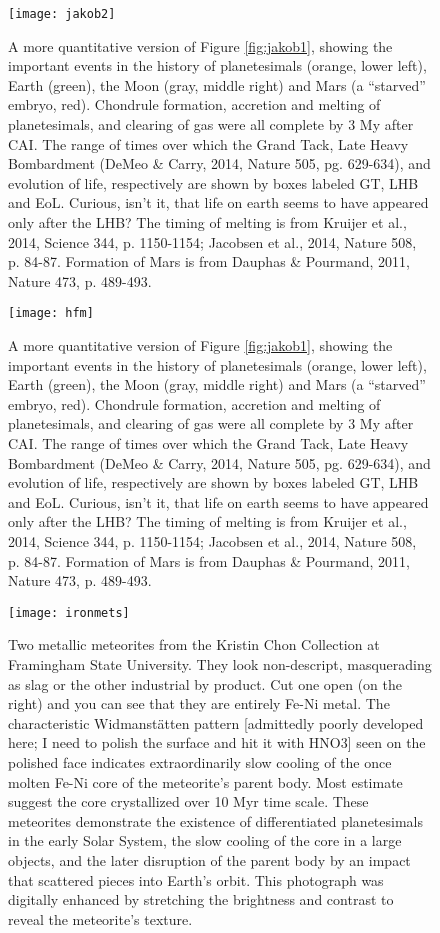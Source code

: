 \documentclass[amstex,12pt]{book}
\begin{document}
\begin{figure}[p]
\centering
\texttt{[image: jakob2]}%
\caption{A more quantitative version of Figure \ref{fig:jakob1}, showing the important events in the history of planetesimals (orange, lower left), Earth (green), the Moon (gray, middle right) and Mars (a ``starved'' embryo, red). Chondrule formation, accretion and melting of planetesimals, and clearing of gas were all complete by 3 My after CAI. The range of times over which the Grand Tack, Late Heavy Bombardment (DeMeo \& Carry, 2014, Nature 505, pg. 629-634), and evolution of life, respectively are shown by boxes labeled GT, LHB and EoL. Curious, isn't it, that life on earth seems to have appeared only after the LHB? The timing of melting is from Kruijer et al., 2014, Science 344, p. 1150-1154; Jacobsen et al., 2014, Nature 508, p. 84-87. Formation of Mars is from Dauphas \& Pourmand, 2011, Nature 473, p. 489-493.}   
\label{fig:jakob2}
\end{figure}


\begin{figure}[p]
\centering
\texttt{[image: hfm]}%
\caption{A more quantitative version of Figure \ref{fig:jakob1}, showing the important events in the history of planetesimals (orange, lower left), Earth (green), the Moon (gray, middle right) and Mars (a ``starved'' embryo, red). Chondrule formation, accretion and melting of planetesimals, and clearing of gas were all complete by 3 My after CAI. The range of times over which the Grand Tack, Late Heavy Bombardment (DeMeo \& Carry, 2014, Nature 505, pg. 629-634), and evolution of life, respectively are shown by boxes labeled GT, LHB and EoL. Curious, isn't it, that life on earth seems to have appeared only after the LHB? The timing of melting is from Kruijer et al., 2014, Science 344, p. 1150-1154; Jacobsen et al., 2014, Nature 508, p. 84-87. Formation of Mars is from Dauphas \& Pourmand, 2011, Nature 473, p. 489-493.}   
\label{fig:hfm}
\end{figure}


\begin{figure}[p]
\centering
\texttt{[image: ironmets]}%
\caption{Two metallic meteorites from the Kristin Chon Collection at Framingham State University. They look non-descript, masquerading as slag or the other industrial by product. Cut one open (on the right) and you can see that they are entirely Fe-Ni metal. The characteristic Widmanstätten pattern [admittedly poorly developed here; I need to polish the surface and hit it with HNO3] seen on the polished face indicates extraordinarily slow cooling of the once molten Fe-Ni core of the meteorite’s parent body. Most estimate suggest the core crystallized over 10 Myr time scale. These meteorites demonstrate the existence of differentiated planetesimals in the early Solar System, the slow cooling of the core in a large objects, and the later disruption of the parent body by an impact that scattered pieces into Earth’s orbit. This photograph was digitally enhanced by stretching the brightness and contrast to reveal the meteorite’s texture.}   
\label{fig:ironmets}
\end{figure}
\end{document}

